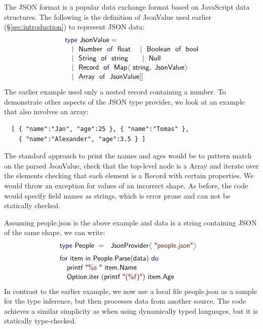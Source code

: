 \documentclass[10pt,preprint,blind,clearpagebib]{sigplanconf}
\newcommand{\langl}{\begin{picture}(4.5,7)
\put(1.1,2.5){\rotatebox{60}{\line(1,0){5.5}}}
\put(1.1,2.5){\rotatebox{300}{\line(1,0){5.5}}}
\end{picture}}
\newcommand{\rangl}{\begin{picture}(4.5,7)
\put(.9,2.5){\rotatebox{120}{\line(1,0){5.5}}}
\put(.9,2.5){\rotatebox{240}{\line(1,0){5.5}}}
\end{picture}}
\newcommand{\kvd}[1]{\textnormal{\textcolor{kvdclr}{\sffamily #1}}}
\newcommand{\str}[1]{\textnormal{\textcolor{strclr}{\sffamily "#1"}}}
\newcommand{\strf}[1]{\textnormal{\textcolor{strclr}{\sffamily #1}}}
\newcommand{\ident}[1]{\textnormal{\sffamily #1}}
\begin{document}
The JSON format is a popular data exchange format based on 
JavaScript data structures. The following is the definition of \ident{JsonValue} 
used earlier (\S\ref{sec:introduction}) to represent JSON data:
%
\begin{equation*}
\begin{array}{l}
 \kvd{type}~\ident{JsonValue} = \\[0.1em]
 \quad|~ \ident{Number}~\kvd{of}~\ident{float} ~~~~|~ \ident{Boolean}~\kvd{of}~\ident{bool} \\[0.1em]
 \quad|~ \ident{String}~\kvd{of}~\ident{string} ~~~~~~ |~ \ident{Null} \\[0.1em]
 \quad|~ \ident{Record}~\kvd{of}~\ident{Map}\langl\ident{string}, \ident{JsonValue}\rangl \\[0.1em]
 \quad|~ \ident{Array}~\kvd{of}~\ident{JsonValue}[] \\[0.1em]
\end{array}
\end{equation*}
%
The earlier example used only a nested record containing a number. To demonstrate other 
aspects of the JSON type provider, we look at an example that also involves an array:
%
{\small{
\begin{verbatim}
  [ { "name":"Jan", "age":25 }, { "name":"Tomas" },
    { "name":"Alexander", "age":3.5 } ]
\end{verbatim}
}}
%
\noindent
The standard approach to print the names and ages would be to pattern match on the parsed 
\ident{JsonValue}, check that the top-level node is a \ident{Array} and iterate over the elements 
checking that each element is a \ident{Record} with certain properties. We would throw an exception 
for values of an incorrect shape. As before, the code would specify field names as strings, which 
is error prone and can not be statically checked.

Assuming \strf{people.json} is the above example and \ident{data} is a string containing
JSON of the same shape, we can write:
%
\begin{equation*}
\begin{array}{l}
 \kvd{type}~\ident{People}~=~\ident{JsonProvider}\langl\str{people.json}\rangl\hspace{1em} \\[0.6em]
 \kvd{for}~\ident{item}~\kvd{in}~\ident{People.Parse}(\ident{data})~\kvd{do}\\[0.1em]
 \quad\ident{printf}~\str{\%s }~\ident{item.Name}\\[0.1em]
 \quad\ident{Option.iter}~(\ident{printf}~\str{(\%f)})~\ident{item.Age}
\end{array}
\end{equation*}
%
In contrast to the earlier example, we now use a local file \strf{people.json} as a sample for 
the type inference, but then processes data from another source. The code achieves a similar 
simplicity as when using dynamically typed languages, but it is statically type-checked.
\end{document}
